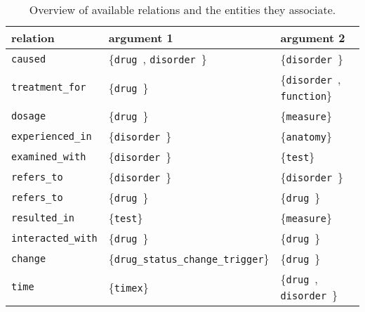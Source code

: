 \documentclass[12pt]{article}
\theoremstyle{definition}
\newcommand{\dis}{\texttt{disorder}\ }
\newcommand{\dr}{\texttt{drug}\ }
\begin{document}
\begin{table}[h]
\centering
\begin{tabular}{@{}lll@{}}
\toprule
\textbf{relation} & \textbf{argument 1} & \textbf{argument 2}\\ \midrule
\texttt{caused} & \{\dr, \dis\} & \{\dis\} \\
\texttt{treatment\_for} & \{\dr\} & \{\dis, \texttt{function}\} \\
\texttt{dosage} & \{\dr\} & \{\texttt{measure}\} \\
\texttt{experienced\_in} & \{\dis\} & \{\texttt{anatomy}\} \\
\texttt{examined\_with} & \{\dis\} & \{\texttt{test}\} \\
\texttt{refers\_to} & \{\dis\} & \{\dis\} \\
\texttt{refers\_to} & \{\dr\} & \{\dr\} \\
\texttt{resulted\_in} & \{\texttt{test}\} & \{\texttt{measure}\} \\
\texttt{interacted\_with} & \{\dr\} & \{\dr\} \\
\texttt{change} & \{\texttt{drug\_status\_change\_trigger}\} & \{\dr\} \\
\texttt{time} & \{\texttt{timex}\} & \{\dr, \dis\} \\



\bottomrule
\end{tabular}
\caption{Overview of available relations and the entities they associate.}
\label{tab:relations}
\end{table}
\end{document}
